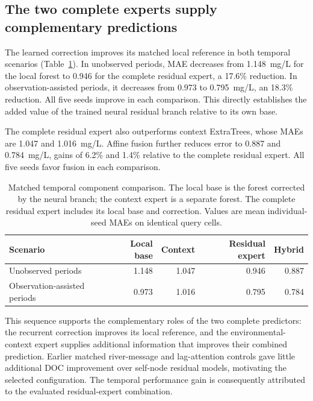 \documentclass[11pt]{article}
\begin{document}
\subsection{The two complete experts supply complementary predictions}
The learned correction improves its matched local reference in both temporal scenarios (Table~\ref{tab:components}). In unobserved periods, MAE decreases from 1.148~mg/L for the local forest to 0.946 for the complete residual expert, a 17.6\% reduction. In observation-assisted periods, it decreases from 0.973 to 0.795~mg/L, an 18.3\% reduction. All five seeds improve in each comparison. This directly establishes the added value of the trained neural residual branch relative to its own base.

The complete residual expert also outperforms context ExtraTrees, whose MAEs are 1.047 and 1.016~mg/L. Affine fusion further reduces error to 0.887 and 0.784~mg/L, gains of 6.2\% and 1.4\% relative to the complete residual expert. All five seeds favor fusion in each comparison.

\begin{table}[htbp]\centering\small
\caption{Matched temporal component comparison. The local base is the forest corrected by the neural branch; the context expert is a separate forest. The complete residual expert includes its local base and correction. Values are mean individual-seed MAEs on identical query cells.}
\label{tab:components}
\begin{tabular}{>{\raggedright\arraybackslash}p{3.7cm}rrrr}\toprule
Scenario & Local base & Context & Residual expert & Hybrid\\\midrule
Unobserved periods & 1.148 & 1.047 & 0.946 & 0.887\\
Observation-assisted periods & 0.973 & 1.016 & 0.795 & 0.784\\
\bottomrule\end{tabular}
\end{table}

\begin{samepage}
This sequence supports the complementary roles of the two complete predictors: the recurrent correction improves its local reference, and the environmental-context expert supplies additional information that improves their combined prediction. Earlier matched river-message and lag-attention controls gave little additional DOC improvement over self-node residual models, motivating the selected configuration. The temporal performance gain is consequently attributed to the evaluated residual-expert combination.
\par\end{samepage}
\end{document}
